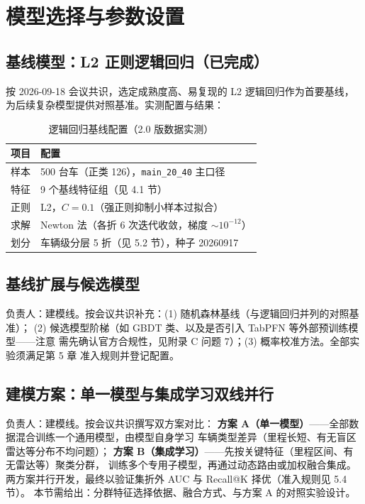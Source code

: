 \section{模型选择与参数设置}

\subsection{基线模型：L2 正则逻辑回归（已完成）}

按 2026-09-18 会议共识，选定成熟度高、易复现的 L2 逻辑回归作为首要基线，
为后续复杂模型提供对照基准。实测配置与结果：

\begin{table}[H]
\centering
\caption{逻辑回归基线配置（2.0 版数据实测）}
\label{tab:baseline-cfg}
\small
\begin{tabular}{ll}
\toprule
项目 & 配置 \\
\midrule
样本 & 500 台车（正类 126），\texttt{main\_20\_40} 主口径 \\
特征 & 9 个基线特征组（见 4.1 节） \\
正则 & L2，$C=0.1$（强正则抑制小样本过拟合） \\
求解 & Newton 法（各折 6 次迭代收敛，梯度 $\sim 10^{-12}$） \\
划分 & 车辆级分层 5 折（见 5.2 节），种子 20260917 \\
\bottomrule
\end{tabular}
\end{table}

\subsection{基线扩展与候选模型}

\begin{TODO}
负责人：建模线。按会议共识补充：(1) 随机森林基线（与逻辑回归并列的对照基准）；
(2) 候选模型阶梯（如 GBDT 类、以及是否引入 TabPFN 等外部预训练模型——注意
需先确认官方合规性，见附录 C 问题 7）；(3) 概率校准方法。全部实验须满足第 5 章
准入规则并登记配置。
\end{TODO}

\subsection{建模方案：单一模型与集成学习双线并行}

\begin{TODO}
负责人：建模线。按会议共识撰写双方案对比：
\textbf{方案 A（单一模型）}——全部数据混合训练一个通用模型，由模型自身学习
车辆类型差异（里程长短、有无盲区雷达等分布不均问题）；
\textbf{方案 B（集成学习）}——先按关键特征（里程区间、有无雷达等）聚类分群，
训练多个专用子模型，再通过动态路由或加权融合集成。
两方案并行开发，最终以验证集折外 AUC 与 Recall@K 择优（准入规则见 5.4 节）。
本节需给出：分群特征选择依据、融合方式、与方案 A 的对照实验设计。
\end{TODO}
